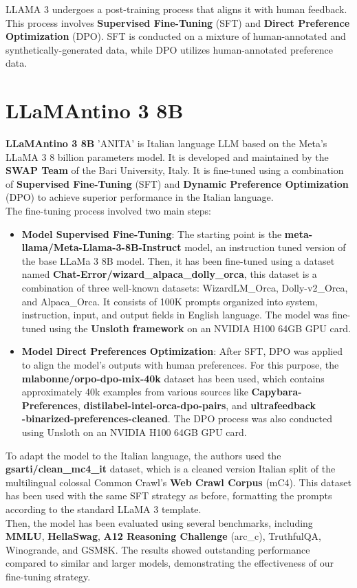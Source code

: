 \documentclass{article}
\begin{document}
		LLAMA 3 undergoes a post-training process that aligns it with human feedback.
		This process involves \textbf{Supervised Fine-Tuning} (SFT) and \textbf{Direct Preference Optimization} (DPO). SFT is conducted on a mixture of human-annotated and synthetically-generated data, while DPO utilizes human-annotated preference data.
		
	\section{LLaMAntino 3 8B}
	\textbf{LLaMAntino 3 8B} 'ANITA' \cite{polignano2024advanced} is Italian language LLM based on the Meta's LLaMA 3 8 billion parameters model. It is developed and maintained by the \textbf{SWAP Team} of the Bari University, Italy. It is fine-tuned using a combination of \textbf{Supervised Fine-Tuning} (SFT) and \textbf{Dynamic Preference Optimization} (DPO) to achieve superior performance in the Italian language. \\
	The fine-tuning process involved two main steps: 
	
	\begin{itemize}
		\item 
			\textbf{Model Supervised Fine-Tuning}: The starting point is the \textbf{meta-llama/Meta-Llama-3-8B-Instruct} model, an instruction tuned version of the base LLaMa 3 8B model. 
			Then, it has been fine-tuned using a dataset named \textbf{Chat-Error/wizard\_alpaca\_dolly\_orca}, this dataset is a combination of three well-known datasets: WizardLM\_Orca, Dolly-v2\_Orca, and Alpaca\_Orca. 
			It consists of 100K prompts organized into system, instruction, input, and output fields in English language.	The model was fine-tuned using the \textbf{Unsloth framework} on an NVIDIA H100 64GB GPU card.
		
		\item 
			\textbf{Model Direct Preferences Optimization}: After SFT, DPO was applied to align the model's outputs with human preferences. For this purpose, the \textbf{mlabonne/orpo-dpo-mix-40k} dataset has been used, which contains approximately 40k examples from various sources like \textbf{Capybara-Preferences}, \textbf{distilabel-intel-orca-dpo-pairs}, and \textbf{ultrafeedback\\-binarized-preferences-cleaned}.
			The DPO process was also conducted using Unsloth on an NVIDIA H100 64GB GPU card.
	\end{itemize}
	
	To adapt the model to the Italian language, the authors used the \textbf{gsarti/clean\_mc4\_it} dataset, which is a cleaned version Italian split of the multilingual colossal Common Crawl's \textbf{Web Crawl Corpus} (mC4).
	This dataset has been used with the same SFT strategy as before, formatting the prompts according to the standard LLaMA 3 template. \\
	Then, the model has been evaluated using several benchmarks, including \textbf{MMLU}, \textbf{HellaSwag},\textbf{ A12 Reasoning Challenge} (arc\_c), TruthfulQA, Winogrande, and GSM8K. 
	The results showed outstanding performance compared to similar and larger models, demonstrating the effectiveness of our fine-tuning strategy.
	
\end{document}
